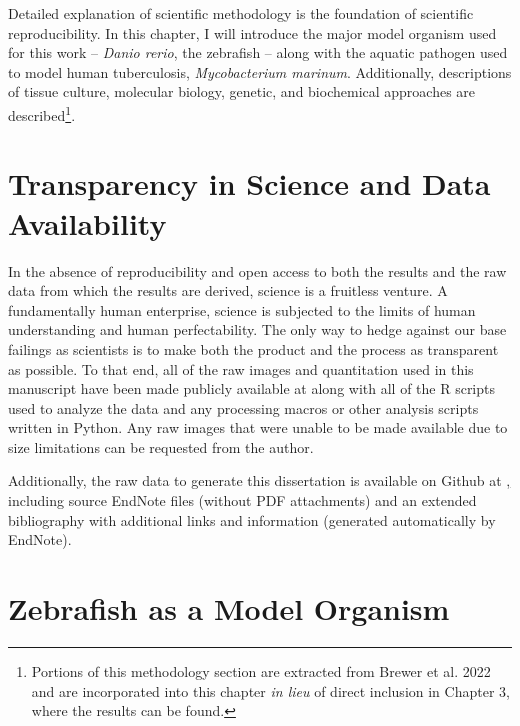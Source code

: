 Detailed explanation of scientific methodology is the foundation of scientific reproducibility. In this chapter, I will introduce the major model organism used for this work -- \textit{Danio rerio}, the zebrafish -- along with the aquatic pathogen used to model human tuberculosis, \textit{Mycobacterium marinum}. Additionally, descriptions of tissue culture, molecular biology, genetic, and biochemical approaches are described\footnote{Portions of this methodology section are extracted from Brewer et al. 2022 and are incorporated into this chapter \textit{in lieu} of direct inclusion in Chapter 3, where the results can be found.}. 

\section{Transparency in Science and Data Availability}

In the absence of reproducibility and open access to both the results and the raw data from which the results are derived, science is a fruitless venture. A fundamentally human enterprise, science is subjected to the limits of human understanding and human perfectability. The only way to hedge against our base failings as scientists is to make both the product and the process as transparent as possible. To that end, all of the raw images and quantitation used in this manuscript have been made publicly available at \href{doi://10.5281/zenodo.6816429}{\cite{NFATZenodo}} along with all of the R scripts used to analyze the data and any processing macros or other analysis scripts written in Python. Any raw images that were unable to be made available due to size limitations can be requested from the author.

Additionally, the raw data to generate this dissertation is available on Github at \href{https://github.com/jaredbrewer/dissertation}, including source EndNote files (without PDF attachments) and an extended bibliography with additional links and information (generated automatically by EndNote).

\section{Zebrafish as a Model Organism}\label{zebrafish}

